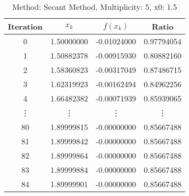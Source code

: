 \begin{table}
\centering
\caption{Method: Secant Method, Multiplicity: 5, x0: 1.5}
\label{tab:table_Secant_Method_5_1_5}
\begin{tabular}{c c c c}
\toprule
Iteration &      $x_k$ &    $f(x_k)$ &      Ratio \\
\midrule
        0 & 1.50000000 & -0.01024000 & 0.97794054 \\
        1 & 1.50882378 & -0.00915930 & 0.80882160 \\
        2 & 1.58360823 & -0.00317049 & 0.87486715 \\
        3 & 1.62319923 & -0.00162494 & 0.84962256 \\
        4 & 1.66482382 & -0.00071939 & 0.85939065 \\
   \vdots &     \vdots &      \vdots &     \vdots \\
       80 & 1.89999815 & -0.00000000 & 0.85667488 \\
       81 & 1.89999842 & -0.00000000 & 0.85667488 \\
       82 & 1.89999864 & -0.00000000 & 0.85667488 \\
       83 & 1.89999884 & -0.00000000 & 0.85667488 \\
       84 & 1.89999901 & -0.00000000 & 0.85667488 \\
\bottomrule
\end{tabular}
\end{table}
